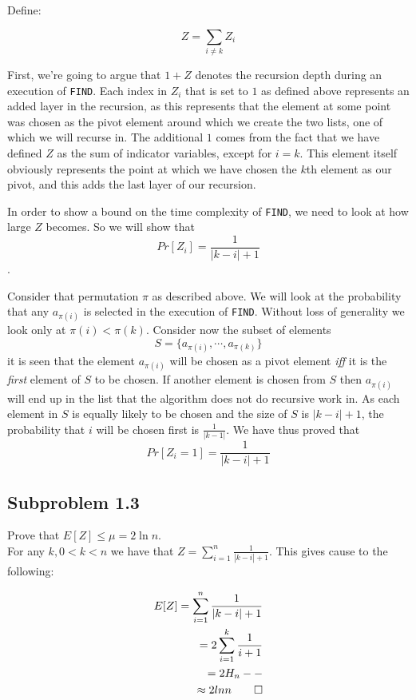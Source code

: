 \documentclass[article,a4paper,oneside]{memoir}
\newcommand{\+}[1]{\ensuremath{\boldsymbol{#1}}}
\begin{document}
Define:

$$Z=\sum_{i\neq k} Z_i$$

First, we're going to argue that $1+Z$ denotes the recursion depth during an execution of \texttt{FIND}. Each index in $Z_i$ that is set to $1$ as defined above represents an added layer in the recursion, as this represents that the element at some point was chosen as the pivot element around which we create the two lists, one of which we will recurse in. The additional $1$ comes from the fact that we have defined $Z$ as the sum of indicator variables, except for $i=k$. This element itself obviously represents the point at which we have chosen the $k$th element as our pivot, and this adds the last layer of our recursion.
\par
In order to show a bound on the time complexity of \texttt{FIND}, we need to look at how large $Z$ becomes. So we will show that $$Pr[Z_{i}]=\frac{1}{|k-i|+1}$$.
\par
Consider that permutation $\pi$ as described above. We will look at the probability that any $a_{\pi(i)}$ is selected in the execution of \texttt{FIND}. Without loss of generality we look only at $\pi(i) < \pi(k)$. Consider now the subset of elements $$S = \lbrace a_{\pi(i)},\cdots,a_{\pi(k)}\rbrace$$ it is seen that the element $a_{\pi(i)}$ will be chosen as a pivot element \emph{iff} it is the \emph{first} element of $S$ to be chosen. If another element is chosen from $S$ then $a_{\pi(i)}$ will end up in the list that the algorithm does not do recursive work in. As each element in $S$ is equally likely to be chosen and the size of $S$ is $|k - i| + 1$, the probability that $i$ will be chosen first is $\frac{1}{|k -1|}$. We have thus proved that $$Pr[Z_{i} = 1] = \frac{1}{|k-i|+1}$$



\subsection{Subproblem 1.3} 
Prove that $E[Z]\leq \mu = 2\ln n$.\\
For any $k, 0<k<n$ we have that $Z = \sum_{i=1}^{n} \frac{1}{|k-i|+1}$.
This gives cause to the following: 

\begin{align*}
E[Z] = \sum_{i=1}^{n} \frac{1}{|k-i|+1}
\\ = 2\sum_{i=1}^{k} \frac{1}{i+1}
\\ = 2H_n--
\\ \approx 2lnn \qedhere
\end{align*}
\end{document}

